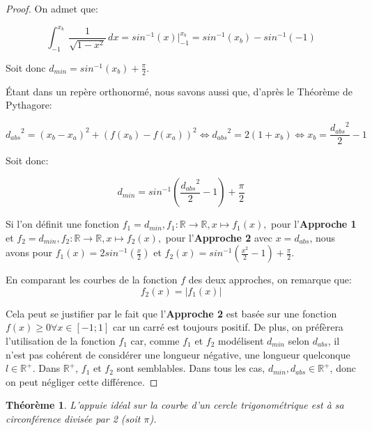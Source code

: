 \documentclass{amsart}
\newtheorem{theorem}{Théorème}[section]
\theoremstyle{definition}
\theoremstyle{remark}
\numberwithin{equation}{section}
\begin{document}
\begin{proof}
  On admet que:

  \[\int_{-1}^{x_b} \frac{1}{\sqrt{1-x^2}}\,dx=sin^{-1}(x)\Biggr|_{-1}^{x_b}=sin^{-1}(x_b)-sin^{-1}(-1)\]

  Soit donc $d_{min}=sin^{-1}(x_b)+\frac{\pi}{2}$.
  
  Étant dans un repère orthonormé, nous savons aussi que, d'après le Théorème de Pythagore:
  
  \[{d_{abs}}^2=(x_b-x_a)^2+(f(x_b)-f(x_a))^2 \Leftrightarrow {d_{abs}}^2=2(1+x_b) \Leftrightarrow x_b=\frac{{d_{abs}}^2}{2}-1\]

  Soit donc:

  \[d_{min}=sin^{-1}(\frac{{d_{abs}}^2}{2}-1)+\frac{\pi}{2}\]

  Si l'on définit une fonction $f_1=d_{min}, f_1:\mathbb{R}\longrightarrow \mathbb{R}, x\longmapsto f_1(x),$ pour l'\textbf{Approche 1} et $f_2=d_{min}, f_2:\mathbb{R}\longrightarrow \mathbb{R}, x\longmapsto f_2(x),$ pour l'\textbf{Approche 2} avec $x=d_{abs}$, nous avons pour $f_1(x)=2sin^{-1}(\frac{x}{2})$ et $f_2(x)=sin^{-1}(\frac{x^2}{2}-1)+\frac{\pi}{2}$.

  En comparant les courbes de la fonction $f$ des deux approches, on remarque que: \[f_2(x)=\lvert f_1(x) \rvert\]

  Cela peut se justifier par le fait que l'\textbf{Approche 2} est basée sur une fonction $f(x)\geq0 \forall x\in[-1;1]$ car un carré est toujours positif. De plus, on préfèrera l'utilisation de la fonction $f_1$ car, comme $f_1$ et $f_2$ 
  modélisent $d_{min}$ selon $d_{abs}$, il n'est pas cohérent de considérer une longueur négative, une longueur quelconque $l\in\mathbb{R^+}$. Dans $\mathbb{R^+}$, $f_1$ et $f_2$ sont semblables. Dans tous les cas, $d_{min},d_{abs}\in\mathbb{R^+}$, donc on peut négliger cette différence.
\end{proof}

\begin{theorem}
  L'appuie idéal sur la courbe d'un cercle trigonométrique est à sa circonférence divisée par 2 (soit $\pi$).
\end{theorem}
\end{document}
